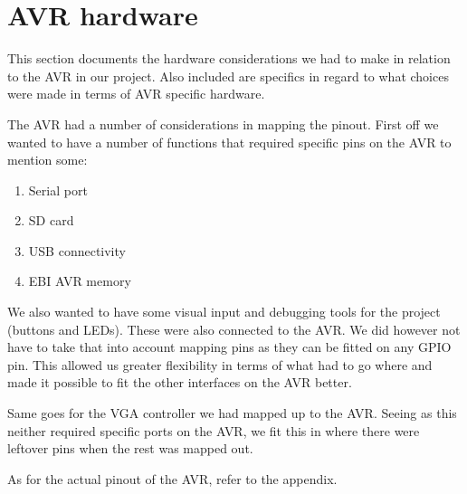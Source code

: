 \section{AVR hardware}

This section documents the hardware considerations we had to make in relation to
the AVR in our project. Also included are specifics in regard to what choices
were made in terms of AVR specific hardware.

The AVR had a number of considerations in mapping the pinout. First off we
wanted to have a number of functions that required specific pins on the AVR to
mention some:

\begin{enumerate}
\item Serial port
\item \ac{SD} card
\item \ac{USB} connectivity
\item \ac{EBI} AVR memory
\end{enumerate}

We also wanted to have some visual input and debugging tools for the project
(buttons and LEDs). These were also connected to the AVR. We did however not
have to take that into account mapping pins as they can be fitted on any
\ac{GPIO} pin. This allowed us greater flexibility in terms of what had to go
where and made it possible to fit the other interfaces on the AVR better.

Same goes for the \ac{VGA} controller we had mapped up to the AVR. Seeing
as this neither required specific ports on the AVR, we fit this in where
there were leftover pins when the rest was mapped out.

As for the actual pinout of the AVR, refer to the appendix.

